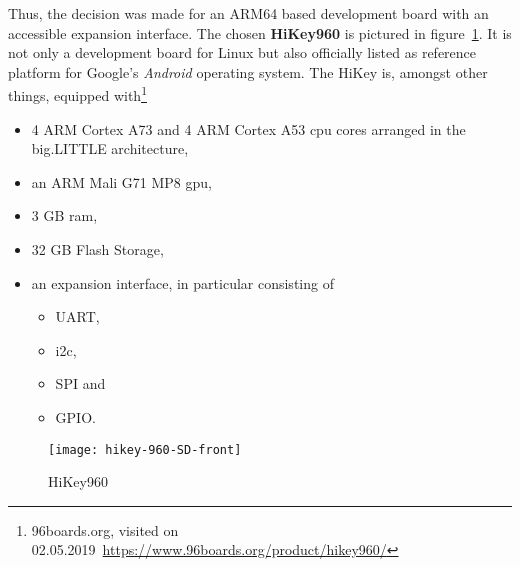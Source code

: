 Thus, the decision was made for an ARM64 based development board with an accessible expansion interface.
The chosen \textbf{HiKey960} is pictured in figure~\ref{pic:hikey}.
It is not only a development board for Linux but also officially listed as reference platform for Google's \textit{Android} operating system.
The HiKey is, amongst other things, equipped with\footnote{96boards.org, visited on 02.05.2019~\url{https://www.96boards.org/product/hikey960/}}
\begin{itemize}
    \item 4 ARM Cortex A73 and 4 ARM Cortex A53 \ac{cpu} cores arranged in the big.LITTLE architecture,
    \item an ARM Mali G71 MP8 \ac{gpu},
    \item 3 GB \ac{ram},
    \item 32 GB Flash Storage,
    \item an expansion interface, in particular consisting of
        \begin{itemize}
            \item UART,
            \item \ac{i2c},
            \item SPI and
            \item GPIO.
        \end{itemize}
\end{itemize}

\begin{figure} [t]
    \centering
    \texttt{[image: hikey-960-SD-front]}
    \caption{HiKey960}\label{pic:hikey}
\end{figure}

